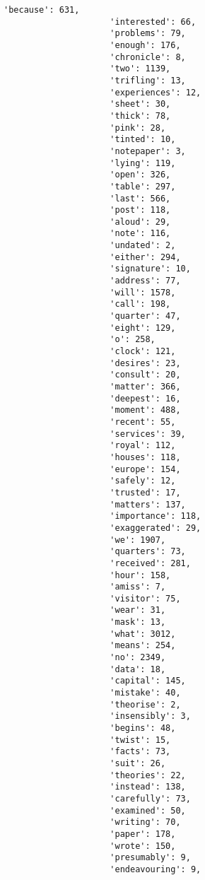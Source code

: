 \documentclass[11pt]{article}
\begin{document}
\begin{Verbatim}[commandchars=\\\{\}]
                     'because': 631,
                     'interested': 66,
                     'problems': 79,
                     'enough': 176,
                     'chronicle': 8,
                     'two': 1139,
                     'trifling': 13,
                     'experiences': 12,
                     'sheet': 30,
                     'thick': 78,
                     'pink': 28,
                     'tinted': 10,
                     'notepaper': 3,
                     'lying': 119,
                     'open': 326,
                     'table': 297,
                     'last': 566,
                     'post': 118,
                     'aloud': 29,
                     'note': 116,
                     'undated': 2,
                     'either': 294,
                     'signature': 10,
                     'address': 77,
                     'will': 1578,
                     'call': 198,
                     'quarter': 47,
                     'eight': 129,
                     'o': 258,
                     'clock': 121,
                     'desires': 23,
                     'consult': 20,
                     'matter': 366,
                     'deepest': 16,
                     'moment': 488,
                     'recent': 55,
                     'services': 39,
                     'royal': 112,
                     'houses': 118,
                     'europe': 154,
                     'safely': 12,
                     'trusted': 17,
                     'matters': 137,
                     'importance': 118,
                     'exaggerated': 29,
                     'we': 1907,
                     'quarters': 73,
                     'received': 281,
                     'hour': 158,
                     'amiss': 7,
                     'visitor': 75,
                     'wear': 31,
                     'mask': 13,
                     'what': 3012,
                     'means': 254,
                     'no': 2349,
                     'data': 18,
                     'capital': 145,
                     'mistake': 40,
                     'theorise': 2,
                     'insensibly': 3,
                     'begins': 48,
                     'twist': 15,
                     'facts': 73,
                     'suit': 26,
                     'theories': 22,
                     'instead': 138,
                     'carefully': 73,
                     'examined': 50,
                     'writing': 70,
                     'paper': 178,
                     'wrote': 150,
                     'presumably': 9,
                     'endeavouring': 9,

\end{Verbatim}
\end{document}
